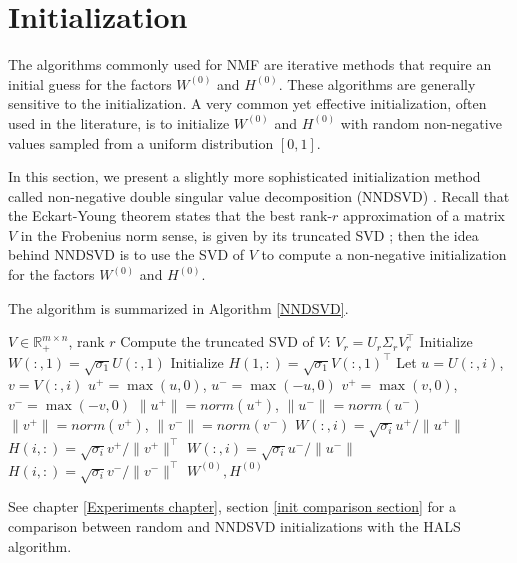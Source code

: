 \section{Initialization} \label{initialization section}
The algorithms commonly used for NMF are iterative methods that require an initial guess for the factors \( W^{(0)} \) and \( H^{(0)} \). These algorithms are generally sensitive to the initialization.
A very common yet effective initialization, often used in the literature, is to initialize \( W^{(0)} \) and \( H^{(0)} \) with random non-negative values sampled from a uniform distribution $[0,1]$.
\par
In this section, we present a slightly more sophisticated initialization method called non-negative double singular value decomposition (NNDSVD) \cite{boutsidis2008svd}.
Recall that the Eckart-Young theorem states that the best rank-$r$ approximation of a matrix $V$ in the Frobenius norm sense, is given by its truncated SVD \cite{schmidt1907theorie}; then the idea behind NNDSVD is to use the SVD of $V$ to compute a non-negative initialization for the factors \( W^{(0)} \) and \( H^{(0)} \).
\par
The algorithm is summarized in Algorithm \ref{NNDSVD}.
\begin{algorithm}
    \caption{Non-negative Double Singular Value Decomposition (NNDSVD) for NMF initialization}
    \label{NNDSVD}
    \begin{algorithmic}[1]
        \Require \( V \in \mathbb{R}_+^{m \times n} \), rank \( r \)
        \State Compute the truncated SVD of \( V \): \( V_r = U_r \Sigma_r V_r^\top \)
        \State Initialize $W(:,1) = \sqrt{\sigma_1} U(:,1)$
        \State Initialize $H(1,:) = \sqrt{\sigma_1} V(:,1)^\top$
            \State Let \( u = U(:,i) \), \( v = V(:,i) \)
            \State \( u^+ = \max(u, 0) \), \( u^- = \max(-u, 0) \)
            \State \( v^+ = \max(v, 0) \), \( v^- = \max(-v, 0) \)
            \State \( \|u^+\| = norm(u^+) \), \( \|u^-\| = norm(u^-) \)
            \State \( \|v^+\| = norm(v^+) \), \( \|v^-\| = norm(v^-) \)     
                \State \( W(:,i) = \sqrt{\sigma_i} u^+ / \|u^+\| \)
                \State \( H(i,:) = \sqrt{\sigma_i} v^+ / \|v^+\|^\top \)
            \Else
                \State \( W(:,i) = \sqrt{\sigma_i} u^- / \|u^-\| \)
                \State \( H(i,:) = \sqrt{\sigma_i} v^- / \|v^-\|^\top \)
            \EndIf
        \EndFor    
        \State \Return \( W^{(0)}, H^{(0)} \)
    \end{algorithmic}
\end{algorithm}
See chapter \ref{Experiments chapter}, section \ref{init comparison section} for a comparison between random and NNDSVD initializations with the HALS algorithm.
